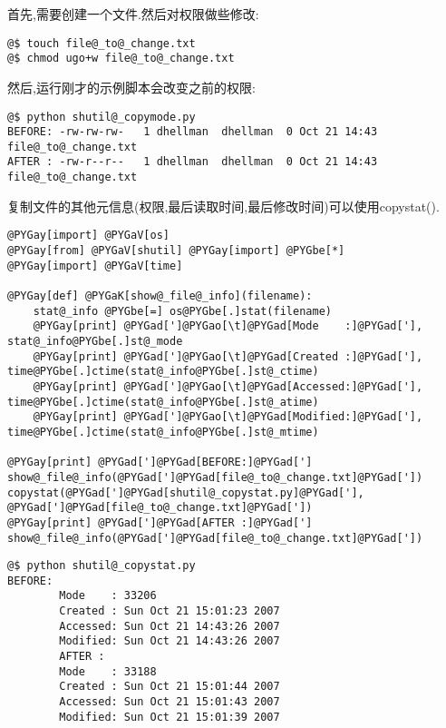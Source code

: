 \documentclass[a4paper,10pt,english]{manual}
\begin{document}
首先,需要创建一个文件.然后对权限做些修改:

\begin{Verbatim}[commandchars=@\[\]]
@$ touch file@_to@_change.txt
@$ chmod ugo+w file@_to@_change.txt
\end{Verbatim}

然后,运行刚才的示例脚本会改变之前的权限:

\begin{Verbatim}[commandchars=@\[\]]
@$ python shutil@_copymode.py
BEFORE: -rw-rw-rw-   1 dhellman  dhellman  0 Oct 21 14:43 file@_to@_change.txt
AFTER : -rw-r--r--   1 dhellman  dhellman  0 Oct 21 14:43 file@_to@_change.txt
\end{Verbatim}

复制文件的其他元信息(权限,最后读取时间,最后修改时间)可以使用copystat().

\begin{Verbatim}[commandchars=@\[\]]
@PYGay[import] @PYGaV[os]
@PYGay[from] @PYGaV[shutil] @PYGay[import] @PYGbe[*]
@PYGay[import] @PYGaV[time]

@PYGay[def] @PYGaK[show@_file@_info](filename):
    stat@_info @PYGbe[=] os@PYGbe[.]stat(filename)
    @PYGay[print] @PYGad[']@PYGao[\t]@PYGad[Mode    :]@PYGad['], stat@_info@PYGbe[.]st@_mode
    @PYGay[print] @PYGad[']@PYGao[\t]@PYGad[Created :]@PYGad['], time@PYGbe[.]ctime(stat@_info@PYGbe[.]st@_ctime)
    @PYGay[print] @PYGad[']@PYGao[\t]@PYGad[Accessed:]@PYGad['], time@PYGbe[.]ctime(stat@_info@PYGbe[.]st@_atime)
    @PYGay[print] @PYGad[']@PYGao[\t]@PYGad[Modified:]@PYGad['], time@PYGbe[.]ctime(stat@_info@PYGbe[.]st@_mtime)

@PYGay[print] @PYGad[']@PYGad[BEFORE:]@PYGad[']
show@_file@_info(@PYGad[']@PYGad[file@_to@_change.txt]@PYGad['])
copystat(@PYGad[']@PYGad[shutil@_copystat.py]@PYGad['], @PYGad[']@PYGad[file@_to@_change.txt]@PYGad['])
@PYGay[print] @PYGad[']@PYGad[AFTER :]@PYGad[']
show@_file@_info(@PYGad[']@PYGad[file@_to@_change.txt]@PYGad['])
\end{Verbatim}

\begin{Verbatim}[commandchars=@\[\]]
@$ python shutil@_copystat.py
BEFORE:
        Mode    : 33206
        Created : Sun Oct 21 15:01:23 2007
        Accessed: Sun Oct 21 14:43:26 2007
        Modified: Sun Oct 21 14:43:26 2007
        AFTER :
        Mode    : 33188
        Created : Sun Oct 21 15:01:44 2007
        Accessed: Sun Oct 21 15:01:43 2007
        Modified: Sun Oct 21 15:01:39 2007
\end{Verbatim}
\end{document}
